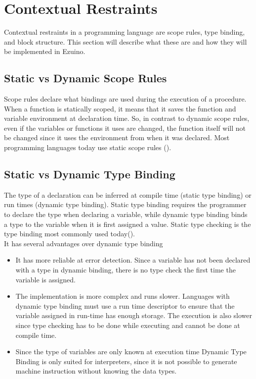 \section{Contextual Restraints}
Contextual restraints in a programming language are scope rules, type binding, and block structure. This section will describe what these are and how they will be implemented in Ezuino.
\subsection{Static vs Dynamic Scope Rules}
Scope rules declare what bindings are used during the execution of a procedure.
When a function is statically scoped, it means that it saves the function and variable environment at declaration time. So, in contrast to dynamic scope rules, even if the variables or functions it uses are changed, the function itself will not be changed since it uses the environment from when it was declared. Most programming languages today use static scope rules (\cite{syntax-and-semantics}). %
\subsection{Static vs Dynamic Type Binding}
The type of a declaration can be inferred at compile time (static type binding) or run times (dynamic type binding). Static type binding requires the programmer to declare the type when declaring a variable, while dynamic type binding binds a type to the variable when it is first assigned a value. Static type checking is the type binding most commonly used today(\cite{conceptsOfProgrammingLanguages}). \\ %
It has several advantages over dynamic type binding
\begin{itemize}
    \item It has more reliable at error detection. Since a variable has not been declared with a type in dynamic binding, there is no type check the first time the variable is assigned.
    \item The implementation is more complex and runs slower. Languages with dynamic type binding must use a run time descriptor to ensure that the variable assigned in run-time has enough storage.
    The execution is also slower since type checking has to be done while executing and cannot be done at compile time.
    \item Since the type of variables are only known at execution time Dynamic Type Binding is only suited for interpreters, since it is not possible to generate machine instruction without knowing the data types.
\end{itemize}

